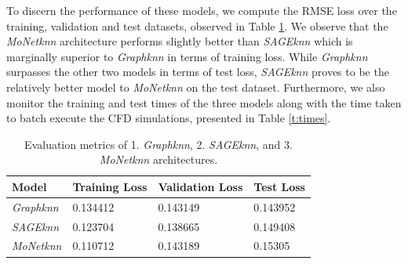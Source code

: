 To discern the performance of these models, we compute the RMSE loss over the training, validation and test datasets, observed in Table \ref{t:predloss}. We observe that the \textit{MoNetknn} architecture performs slightly better than \textit{SAGEknn} which is marginally superior to \textit{Graphknn} in terms of training loss. While \textit{Graphknn} surpasses the other two models in terms of test loss, \textit{SAGEknn} proves to be the relatively better model to \textit{MoNetknn} on the test dataset. Furthermore, we also monitor the training and test times of the three models along with the time taken to batch execute the CFD simulations, presented in Table \ref{t:times}. 
\begin{table}[ht]
    \centering
    \caption{Evaluation metrics of  1. \textit{Graphknn}, 2. \textit{SAGEknn}, and 3. \textit{MoNetknn} architectures. } 
    \label{t:predloss}
    \begin{tabular}{|l|l|l|l|}
    \hline
    \textbf{Model} & \textbf{Training Loss} & \textbf{Validation Loss} & \textbf{Test Loss}\\
    \hline
     \textit{Graphknn} & 0.134412& 0.143149 & 0.143952   \\
    \hline
    \textit{SAGEknn}& 0.123704 & 0.138665 & 0.149408 \\
    \hline
    \textit{MoNetknn} & 0.110712  & 0.143189& 0.15305  \\
    \hline
    \end{tabular}
\end{table}
